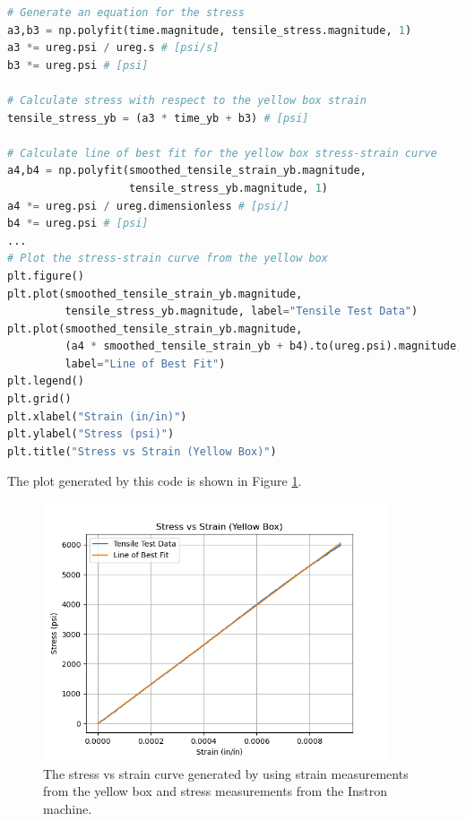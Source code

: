 \documentclass[12 pt]{report}
\begin{document}
\begin{parlist}
	\begin{lstlisting}[label={code:stress_strain_yb}, caption={The code used to plot the stress vs strain curve generated from the strain measurements taken by the NI USB-6000.},language=Python]
# Generate an equation for the stress
a3,b3 = np.polyfit(time.magnitude, tensile_stress.magnitude, 1)
a3 *= ureg.psi / ureg.s # [psi/s]
b3 *= ureg.psi # [psi]

# Calculate stress with respect to the yellow box strain
tensile_stress_yb = (a3 * time_yb + b3) # [psi]

# Calculate line of best fit for the yellow box stress-strain curve
a4,b4 = np.polyfit(smoothed_tensile_strain_yb.magnitude,
                   tensile_stress_yb.magnitude, 1)
a4 *= ureg.psi / ureg.dimensionless # [psi/]
b4 *= ureg.psi # [psi]
...
# Plot the stress-strain curve from the yellow box
plt.figure()
plt.plot(smoothed_tensile_strain_yb.magnitude,
         tensile_stress_yb.magnitude, label="Tensile Test Data")
plt.plot(smoothed_tensile_strain_yb.magnitude,
         (a4 * smoothed_tensile_strain_yb + b4).to(ureg.psi).magnitude,
         label="Line of Best Fit")
plt.legend()
plt.grid()
plt.xlabel("Strain (in/in)")
plt.ylabel("Stress (psi)")
plt.title("Stress vs Strain (Yellow Box)")\end{lstlisting}

	The plot generated by this code is shown in Figure \ref{fig:stress_strain_yb}.
	
	\begin{figure}[htbp]
		\centering
		\includegraphics[width=4in]{images/graphs/Stress vs Strain YB}
		\caption{The stress vs strain curve generated by using strain measurements from the yellow box and stress measurements from the Instron machine.}
		\label{fig:stress_strain_yb}
	\end{figure}
	

\end{parlist}
\end{document}
